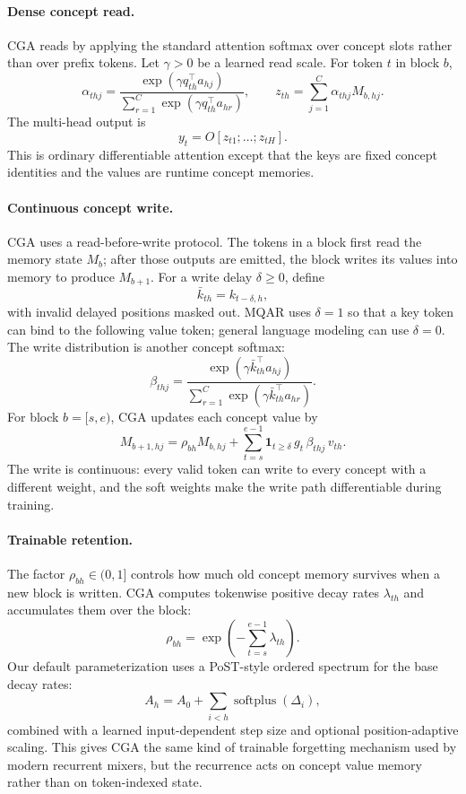 \paragraph{Dense concept read.}
CGA reads by applying the standard attention softmax over concept slots rather than over prefix tokens. Let $\gamma>0$ be a learned read scale. For token $t$ in block $b$,
\[
\alpha_{thj}
=
\frac{\exp(\gamma q_{th}^{\top}a_{hj})}
{\sum_{r=1}^{C}\exp(\gamma q_{th}^{\top}a_{hr})},
\qquad
z_{th}=\sum_{j=1}^{C}\alpha_{thj}M_{b,hj}.
\]
The multi-head output is
\[
y_t=O[z_{t1};\ldots;z_{tH}].
\]
This is ordinary differentiable attention except that the keys are fixed concept identities and the values are runtime concept memories.

\paragraph{Continuous concept write.}
CGA uses a read-before-write protocol. The tokens in a block first read the memory state $M_b$; after those outputs are emitted, the block writes its values into memory to produce $M_{b+1}$. For a write delay $\delta\ge0$, define
\[
\bar k_{th}=k_{t-\delta,h},
\]
with invalid delayed positions masked out. MQAR uses $\delta=1$ so that a key token can bind to the following value token; general language modeling can use $\delta=0$. The write distribution is another concept softmax:
\[
\beta_{thj}
=
\frac{\exp(\gamma \bar k_{th}^{\top}a_{hj})}
{\sum_{r=1}^{C}\exp(\gamma \bar k_{th}^{\top}a_{hr})}.
\]
For block $b=[s,e)$, CGA updates each concept value by
\[
M_{b+1,hj}
=
\rho_{bh} M_{b,hj}
+
\sum_{t=s}^{e-1}
\mathbf{1}_{t\ge \delta}\,
g_t\,\beta_{thj}\,v_{th}.
\]
The write is continuous: every valid token can write to every concept with a different weight, and the soft weights make the write path differentiable during training.

\paragraph{Trainable retention.}
The factor $\rho_{bh}\in(0,1]$ controls how much old concept memory survives when a new block is written. CGA computes tokenwise positive decay rates $\lambda_{th}$ and accumulates them over the block:
\[
\rho_{bh}
=
\exp\left(-\sum_{t=s}^{e-1}\lambda_{th}\right).
\]
Our default parameterization uses a PoST-style ordered spectrum for the base decay rates:
\[
A_h=A_0+\sum_{i<h}\operatorname{softplus}(\Delta_i),
\]
combined with a learned input-dependent step size and optional position-adaptive scaling. This gives CGA the same kind of trainable forgetting mechanism used by modern recurrent mixers, but the recurrence acts on concept value memory rather than on token-indexed state.

